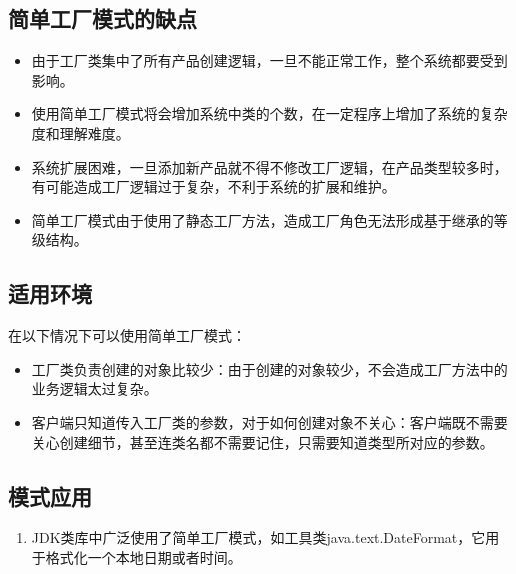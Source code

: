 \documentclass[letterpaper,10pt,english]{sphinxmanual}
\begin{document}
\subsection{简单工厂模式的缺点}
\label{\detokenize{creational_patterns/simple_factory:id10}}\begin{itemize}
\item {} 
\sphinxAtStartPar
由于工厂类集中了所有产品创建逻辑，一旦不能正常工作，整个系统都要受到影响。

\item {} 
\sphinxAtStartPar
使用简单工厂模式将会增加系统中类的个数，在一定程序上增加了系统的复杂度和理解难度。

\item {} 
\sphinxAtStartPar
系统扩展困难，一旦添加新产品就不得不修改工厂逻辑，在产品类型较多时，有可能造成工厂逻辑过于复杂，不利于系统的扩展和维护。

\item {} 
\sphinxAtStartPar
简单工厂模式由于使用了静态工厂方法，造成工厂角色无法形成基于继承的等级结构。

\end{itemize}


\subsection{适用环境}
\label{\detokenize{creational_patterns/simple_factory:id11}}
\sphinxAtStartPar
在以下情况下可以使用简单工厂模式：
\begin{itemize}
\item {} 
\sphinxAtStartPar
工厂类负责创建的对象比较少：由于创建的对象较少，不会造成工厂方法中的业务逻辑太过复杂。

\item {} 
\sphinxAtStartPar
客户端只知道传入工厂类的参数，对于如何创建对象不关心：客户端既不需要关心创建细节，甚至连类名都不需要记住，只需要知道类型所对应的参数。

\end{itemize}


\subsection{模式应用}
\label{\detokenize{creational_patterns/simple_factory:id12}}\begin{enumerate}
%
\item {} 
\sphinxAtStartPar
JDK类库中广泛使用了简单工厂模式，如工具类java.text.DateFormat，它用于格式化一个本地日期或者时间。

\end{enumerate}
\end{document}
